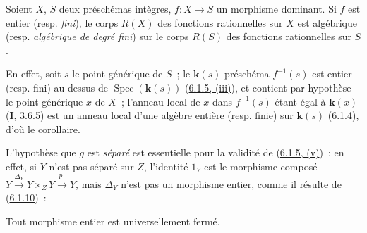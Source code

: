 \begin{corollary}[6.1.8]
\label{II.6.1.8-fr}
Soient $X$, $S$ deux préschémas intègres, $f:X\to S$ un morphisme \textup{dominant}. Si
$f$ est entier \textup{(resp. \emph{fini})}, le corps $R(X)$ des fonctions rationnelles sur
$X$ est algébrique \textup{(resp. \emph{algébrique de degré fini})} sur le corps $R(S)$ des
fonctions rationnelles sur $S$.
\end{corollary}

En effet, soit $s$ le point générique de $S$~; le $\boldsymbol{k}(s)$-préschéma
$f^{-1}(s)$ est entier (resp. fini) au-dessus de
$\operatorname{Spec}(\boldsymbol{k}(s))$ (\hyperref[II.6.1.5-fr]{6.1.5, (iii)}), et
contient par hypothèse le point générique $x$ de $X$~; l'anneau local de $x$
dans $f^{-1}(s)$ étant égal à $\boldsymbol{k}(x)$ (\hyperref[I.3.6.5-fr]{\textbf{I}, 3.6.5}) est un
anneau local d'une algèbre entière (resp. finie) sur $\boldsymbol{k}(s)$
(\hyperref[II.6.1.4-fr]{6.1.4}), d'où le corollaire.

\begin{remark}[6.1.9]
\label{II.6.1.9-fr}
L'hypothèse que $g$ est \emph{séparé} est essentielle pour la validité de
(\hyperref[II.6.1.5-fr]{6.1.5, (v)})~: en effet, si $Y$ n'est pas séparé sur
$Z$, l'identité $1_Y$ est le morphisme composé
$Y\xrightarrow{\Delta_Y}Y\times_ZY\xrightarrow{p_1}Y$, mais $\Delta_Y$ n'est
pas un morphisme entier, comme il résulte de
(\hyperref[II.6.1.10-fr]{6.1.10})~:
\end{remark}

\begin{proposition}[6.1.10]
\label{II.6.1.10-fr}
Tout morphisme entier est universellement fermé.
\end{proposition}

